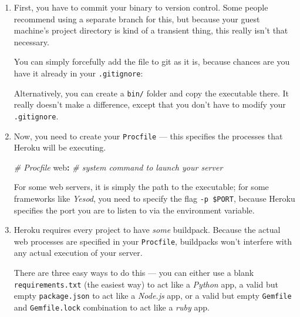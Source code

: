 \documentclass[]{article}
\newenvironment{Shaded}{}{}
\newcommand{\AttributeTok}[1]{\textcolor[rgb]{0.49,0.56,0.16}{#1}}
\newcommand{\CommentTok}[1]{\textcolor[rgb]{0.38,0.63,0.69}{\textit{#1}}}
\newcommand{\ExtensionTok}[1]{#1}
\newcommand{\FunctionTok}[1]{\textcolor[rgb]{0.02,0.16,0.49}{#1}}
\newcommand{\KeywordTok}[1]{\textcolor[rgb]{0.00,0.44,0.13}{\textbf{#1}}}
\newcommand{\NormalTok}[1]{#1}
\begin{document}
\begin{enumerate}
\def\labelenumi{\arabic{enumi}.}
\item
  First, you have to commit your binary to version control. Some people
  recommend using a separate branch for this, but because your guest machine's
  project directory is kind of a transient thing, this really isn't that
  necessary.

  You can simply forcefully add the file to git as it is, because chances are
  you have it already in your \texttt{.gitignore}:

\begin{Shaded}
\end{Shaded}

  Alternatively, you can create a \texttt{bin/} folder and copy the executable
  there. It really doesn't make a difference, except that you don't have to
  modify your \texttt{.gitignore}.
\item
  Now, you need to create your \texttt{Procfile} --- this specifies the
  processes that Heroku will be executing.

\begin{Shaded}
\begin{Highlighting}[]
\CommentTok{\# Procfile}
\FunctionTok{web}\KeywordTok{:}\CommentTok{ \# system command to launch your server}
\end{Highlighting}
\end{Shaded}

  For some web servers, it is simply the path to the executable; for some
  frameworks like \emph{Yesod}, you need to specify the flag
  \texttt{-p\ \$PORT}, because Heroku specifies the port you are to listen to
  via the environment variable.
\item
  Heroku requires every project to have \emph{some} buildpack. Because the
  actual web processes are specified in your \texttt{Procfile}, buildpacks won't
  interfere with any actual execution of your server.

  There are three easy ways to do this --- you can either use a blank
  \texttt{requirements.txt} (the easiest way) to act like a \emph{Python} app, a
  valid but empty \texttt{package.json} to act like a \emph{Node.js} app, or a
  valid but empty \texttt{Gemfile} and \texttt{Gemfile.lock} combination to act
  like a \emph{ruby} app.


\end{enumerate}
\end{document}
